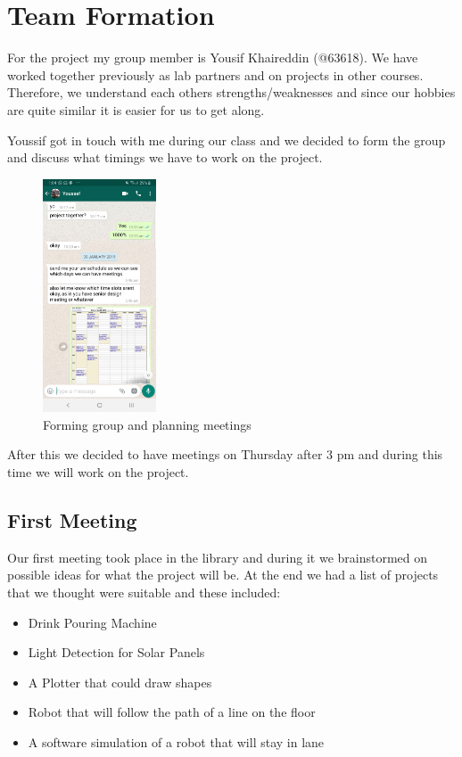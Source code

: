 \documentclass[a4paper, 12pt]{article}
\begin{document}
    \section{Team Formation}

    For the project my group member is Yousif Khaireddin (@63618). We have worked together previously as lab partners and on projects in other courses. Therefore, we understand each others strengths/weaknesses and since our hobbies are quite similar it is easier for us to get along. 

    Youssif got in touch with me during our class and we decided to form the group and discuss what timings we have to work on the project.

    \begin{figure}[h]
        \centering
        \captionsetup{justification=centering}
        \centering
            \includegraphics[width=0.3\textwidth]{GF.jpeg}
            \caption{Forming group and planning meetings}
    \end{figure}


    After this we decided to have meetings on Thursday after 3 pm and during this time we will work on the project.

    \subsection{First Meeting}

    Our first meeting took place in the library and during it we brainstormed on possible ideas for what the project will be. At the end we had a list of projects that we thought were suitable and these included:

    \begin{itemize}
        \item Drink Pouring Machine
        \item Light Detection for Solar Panels
        \item A Plotter that could draw shapes
        \item Robot that will follow the path of a line on the floor
        \item A software simulation of a robot that will stay in lane
    \end{itemize}
\end{document}
